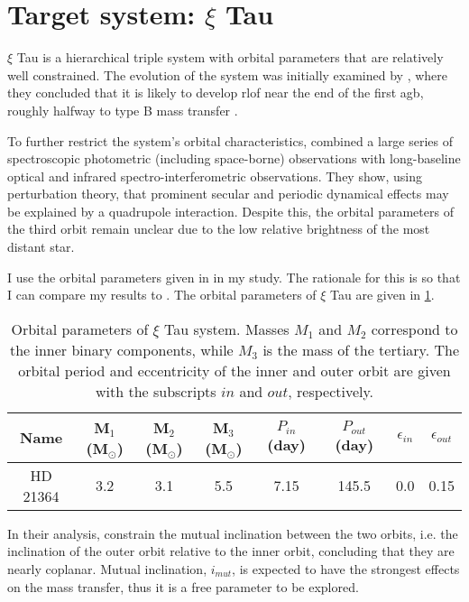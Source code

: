 \section{Target system: $\xi$ Tau}

$\xi$ Tau is a hierarchical triple system with orbital parameters that are relatively well constrained. The evolution of the system was initially examined by \cite{de2014evolution}, where they  concluded that it is likely to develop \ac{rlof} near the end of the first \ac{agb}, roughly halfway to type B mass transfer \citep{kippenhahn1967entwicklung}.

To further restrict the system's orbital characteristics, \cite{nemravova2016xitauri} combined a large series of spectroscopic photometric (including space-borne) observations with long-baseline optical and infrared spectro-interferometric observations. They show, using perturbation theory, that prominent secular and periodic dynamical effects may be explained by a quadrupole interaction. Despite this, the orbital parameters of the third orbit remain unclear due to the low relative brightness of the most distant star.

I use the orbital parameters given in \cite{2010yCat..73890925T} in my study. The rationale for this is so that I can compare my results to \cite{de2014evolution}. The orbital parameters of $\xi$ Tau are given in \cref{tab:system_orbit_param}.
\begin{table}[H]
    \centering
    \begin{tabular}{|c c c c c c c c|}
       Name & M$_1$ (M$_{\odot}$) & M$_2$ (M$_{\odot}$) &
       M$_3$ (M$_{\odot}$) & $P_{in}$ (day) &
       $P_{out}$ (day) & $\epsilon_{in}$ &
       $\epsilon_{out}$ \\
       \hline
       HD 21364 & 3.2 & 3.1 & 5.5 & 7.15 & 145.5 & 0.0 & 0.15
    \end{tabular}
    \caption{Orbital parameters of $\xi$ Tau system. Masses $M_1$ and $M_2$ correspond to the inner binary components, while $M_3$ is the mass of the tertiary. The orbital period and eccentricity of the inner and outer orbit are given with the subscripts $in$ and $out$, respectively.}
    \label{tab:system_orbit_param}
\end{table}
In their analysis, \cite{nemravova2016xitauri} constrain  the mutual inclination between the two orbits, i.e. the inclination of the outer orbit relative to the inner orbit, concluding that they are nearly coplanar. Mutual inclination, $i_{mut}$, is expected to have the strongest effects on the mass transfer, thus it is a free parameter to be explored.
